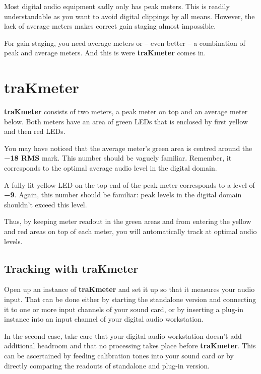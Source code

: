 Most digital audio equipment sadly only has peak meters.  This is
readily understandable as you want to avoid digital clippings by all
means.  However, the lack of average meters makes correct gain staging
almost impossible.

For gain staging, you need average meters or -- even better -- a
combination of peak and average meters.  And this is were
\textbf{traKmeter} comes in.

\chapter{traKmeter}
\label{chap:trakmeter}

\textbf{traKmeter} consists of two meters, a peak meter on top and an
average meter below.  Both meters have an area of green LEDs that is
enclosed by first yellow and then red LEDs.

You may have noticed that the average meter's green area is centred
around the \textbf{\SI{-18}{\dBFS} RMS} mark.  This number should be
vaguely familiar.  Remember, it corresponds to the optimal average
audio level in the digital domain.

A fully lit yellow LED on the top end of the peak meter corresponds to
a level of \textbf{\SI{-9}{\dBFS}}.  Again, this number should be
familiar: peak levels in the digital domain shouldn't exceed this
level.

Thus, by keeping meter readout in the green areas and from entering
the yellow and red areas on top of each meter, you will automatically
track at optimal audio levels.

\section{Tracking with traKmeter}
\label{sec:tracking_with_trakmeter}

Open up an instance of \textbf{traKmeter} and set it up so that it
measures your audio input.  That can be done either by starting the
standalone version and connecting it to one or more input channels of
your sound card, or by inserting a plug-in instance into an input
channel of your digital audio workstation.

In the second case, take care that your digital audio workstation
doesn't add additional headroom and that no processing takes place
before \textbf{traKmeter}.  This can be ascertained by feeding
calibration tones into your sound card or by directly comparing the
readouts of standalone and plug-in version.

